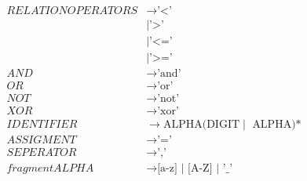 \begin{align*}
    RELATIONOPERATORS       & \to \text{'<'}                                                                        \\
                            & \mid \text{'>'}                                                                       \\
                            & \mid \text{'<='}                                                                      \\
                            & \mid \text{'>='}                                                                      \\
    AND                     & \to \text{'and'}                                                                      \\
    OR                      & \to \text{'or'}                                                                       \\
    NOT                     & \to \text{'not'}                                                                      \\
    XOR                     & \to \text{'xor'}                                                                      \\
    IDENTIFIER              & \to \text{ALPHA(DIGIT} \mid \text{ ALPHA)*}                                           \\
    ASSIGMENT               & \to \text{'='}                                                                        \\
    SEPERATOR               & \to \text{','}                                                                        \\
    fragment ALPHA          & \to \text{[a-z] | [A-Z] | '\_'}
\end{align*}